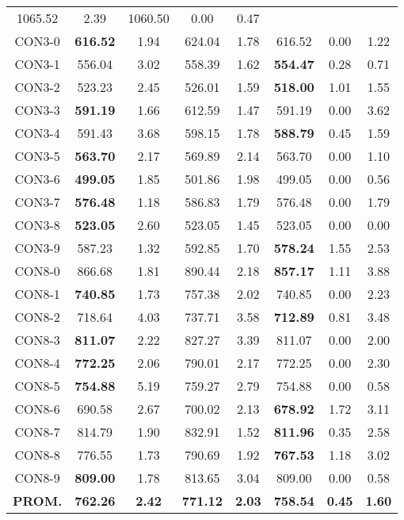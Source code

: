 \begin{table}[h]
\begin{tabular}{c c c c c c c c}
1065.52 & 2.39 & 1060.50 & 0.00
 & 0.47\\CON3-0 & \bf{616.52} & 1.94 & 
624.04 & 1.78 & 616.52 & 0.00
 & 1.22\\CON3-1 & 556.04 & 3.02 & 
558.39 & 1.62 & \bf{554.47} & 
0.28 & 0.71\\CON3-2 & 523.23 & 2.45 & 
526.01 & 1.59 & \bf{518.00} & 
1.01 & 1.55\\CON3-3 & \bf{591.19} & 1.66 & 
612.59 & 1.47 & 591.19 & 0.00
 & 3.62\\CON3-4 & 591.43 & 3.68 & 
598.15 & 1.78 & \bf{588.79} & 
0.45 & 1.59\\CON3-5 & \bf{563.70} & 2.17 & 
569.89 & 2.14 & 563.70 & 0.00
 & 1.10\\CON3-6 & \bf{499.05} & 1.85 & 
501.86 & 1.98 & 499.05 & 0.00
 & 0.56\\CON3-7 & \bf{576.48} & 1.18 & 
586.83 & 1.79 & 576.48 & 0.00
 & 1.79\\CON3-8 & \bf{523.05} & 2.60 & 
523.05 & 1.45 & 523.05 & 0.00
 & 0.00\\
CON3-9 & 587.23 & 1.32 & 
592.85 & 1.70 & \bf{578.24} & 
1.55 & 2.53\\CON8-0 & 866.68 & 1.81 & 
890.44 & 2.18 & \bf{857.17} & 
1.11 & 3.88\\CON8-1 & \bf{740.85} & 1.73 & 
757.38 & 2.02 & 740.85 & 0.00
 & 2.23\\CON8-2 & 718.64 & 4.03 & 
737.71 & 3.58 & \bf{712.89} & 
0.81 & 3.48\\CON8-3 & \bf{811.07} & 2.22 & 
827.27 & 3.39 & 811.07 & 0.00
 & 2.00\\CON8-4 & \bf{772.25} & 2.06 & 
790.01 & 2.17 & 772.25 & 0.00
 & 2.30\\CON8-5 & \bf{754.88} & 5.19 & 
759.27 & 2.79 & 754.88 & 0.00
 & 0.58\\CON8-6 & 690.58 & 2.67 & 
700.02 & 2.13 & \bf{678.92} & 
1.72 & 3.11\\CON8-7 & 814.79 & 1.90 & 
832.91 & 1.52 & \bf{811.96} & 
0.35 & 2.58\\CON8-8 & 776.55 & 1.73 & 
790.69 & 1.92 & \bf{767.53} & 
1.18 & 3.02\\CON8-9 & \bf{809.00} & 1.78 & 
813.65 & 3.04 & 809.00 & 0.00
 & 0.58\\\bf{PROM.} & 
\bf{762.26} & \bf{2.42} & \bf{771.12} & \bf{2.03} & \bf{758.54} & \bf{0.45} & \bf{1.60}\\[1ex]\hline
\end{tabular}
\label{table:nonlin}
\end{table}
